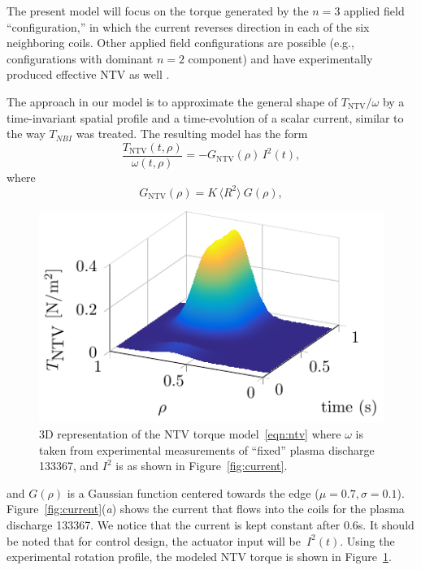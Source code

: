 \documentclass{iopart}
\begin{document}
The present model  will focus on the torque generated by the $n=3$ applied field ``configuration,'' in which the current reverses direction in each of the six neighboring coils. Other applied field configurations are possible (e.g., configurations with dominant $n = 2$ component) and have experimentally produced effective NTV as well \cite{Sabbagh10}.
 
The approach in our model is to approximate the general shape of $T_\text{NTV}/\omega$ by a time-invariant spatial profile and a time-evolution of a scalar current, similar to the way $T_{NBI}$ was treated. The resulting model has the form  
\begin{equation}
   \frac{T_\text{NTV}(t,\rho)}{\omega(t,\rho)} = - G_\text{NTV}  (\rho) \, I^2(t),
\end{equation}
where
\begin{equation}
G_\text{NTV}  (\rho) = K \,  \langle R^2 \rangle \:G(\rho),
\end{equation}
%
\begin{figure}
\centering
\includegraphics{fig7} %
\caption{3D representation of the NTV torque model~\eqref{eqn:ntv} where
  $\omega$ is taken from experimental measurements of ``fixed'' plasma discharge
  133367, and $I^2$ is as shown in Figure~\ref{fig:current}.}
\label{TNTV3D}
\end{figure}
%
and $G(\rho)$ is a Gaussian function centered towards the edge ($\mu =0.7, \sigma =0.1$).
%
Figure~{\ref{fig:current}}(\emph{a}) shows the current that flows into the coils
for the plasma discharge 133367. We notice that the current is kept constant
after $0.6$s. It should be noted that for control design, the actuator input
will be~$I^2(t)$.
%
Using the experimental rotation profile, the modeled NTV torque is shown in Figure~\ref{TNTV3D}.
\end{document}
